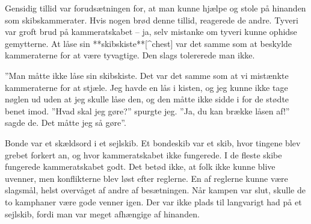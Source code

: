 \documentclass{book}
\begin{document}


Gensidig tillid var forudsætningen for, at man kunne hjælpe og stole på hinanden som
skibskammerater. Hvis nogen brød denne tillid, reagerede de andre. Tyveri var groft brud
på kammeratskabet – ja, selv mistanke om tyveri kunne ophidse gemytterne. At låse sin
**skibskiste**[^chest] var det samme som at beskylde kammeraterne for at være tyvagtige. Den slags
tolererede man ikke.

 ”Man måtte ikke låse sin skibskiste. Det var det samme som at vi mistænkte kammeraterne
for at stjæle. Jeg havde en lås i kisten, og jeg kunne ikke tage nøglen ud uden at jeg
skulle låse den, og den måtte ikke sidde i for de stødte benet imod. ”Hvad skal
jeg gøre?” spurgte jeg. ”Ja, du kan brække låsen af!” sagde de. Det måtte jeg så
gøre”.

Bonde var et skældsord i et sejlskib. Et bondeskib var et skib, hvor tingene blev
grebet forkert an, og hvor kammeratskabet ikke fungerede. I de fleste skibe
fungerede kammeratskabet godt. Det betød ikke, at folk ikke kunne blive uvenner,
men konflikterne blev løst efter reglerne. En af reglerne kunne være slagsmål,
helst overvåget af andre af besætningen. Når kampen var slut, skulle de to
kamphaner være gode venner igen. Der var ikke plads til langvarigt had på et
sejlskib, fordi man var meget afhængige af hinanden.
\end{document}

